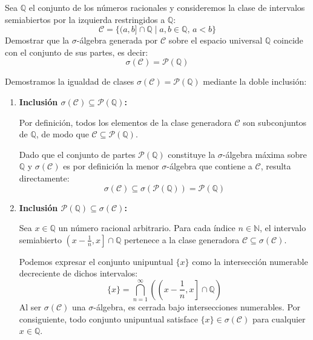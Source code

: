 \newpage
\begin{problema}
Sea $\mathbb{Q}$ el conjunto de los números racionales y consideremos la clase de intervalos semiabiertos por la izquierda restringidos a $\mathbb{Q}$:
\[
    \mathcal{C} = \bigl\{ (a, b] \cap \mathbb{Q} \mid a, b \in \mathbb{Q}, \, a < b \bigr\}
\]
Demostrar que la $\sigma$-álgebra generada por $\mathcal{C}$ sobre el espacio universal $\mathbb{Q}$ coincide con el conjunto de sus partes, es decir:
\[
    \sigma(\mathcal{C}) = \mathcal{P}(\mathbb{Q})
\]

\tcblower

Demostramos la igualdad de clases $\sigma(\mathcal{C}) = \mathcal{P}(\mathbb{Q})$ mediante la doble inclusión:

\begin{enumerate}
    \item \textbf{Inclusión $\sigma(\mathcal{C}) \subseteq \mathcal{P}(\mathbb{Q})$:}
    
    Por definición, todos los elementos de la clase generadora $\mathcal{C}$ son subconjuntos de $\mathbb{Q}$, de modo que $\mathcal{C} \subseteq \mathcal{P}(\mathbb{Q})$. 
    
    Dado que el conjunto de partes $\mathcal{P}(\mathbb{Q})$ constituye la $\sigma$-álgebra máxima sobre $\mathbb{Q}$ y $\sigma(\mathcal{C})$ es por definición la menor $\sigma$-álgebra que contiene a $\mathcal{C}$, resulta directamente:
    \[
        \sigma(\mathcal{C}) \subseteq \sigma(\mathcal{P}(\mathbb{Q})) = \mathcal{P}(\mathbb{Q})
    \]

    \item \textbf{Inclusión $\mathcal{P}(\mathbb{Q}) \subseteq \sigma(\mathcal{C})$:}
    
    Sea $x \in \mathbb{Q}$ un número racional arbitrario. Para cada índice $n \in \mathbb{N}$, el intervalo semiabierto $\left(x - \frac{1}{n}, x\right] \cap \mathbb{Q}$ pertenece a la clase generadora $\mathcal{C} \subseteq \sigma(\mathcal{C})$.
    
    Podemos expresar el conjunto unipuntual $\{x\}$ como la intersección numerable decreciente de dichos intervalos:
    \[
        \{x\} = \bigcap_{n=1}^\infty \left( \left(x - \frac{1}{n}, x\right] \cap \mathbb{Q} \right)
    \]
    Al ser $\sigma(\mathcal{C})$ una $\sigma$-álgebra, es cerrada bajo intersecciones numerables. Por consiguiente, todo conjunto unipuntual satisface $\{x\} \in \sigma(\mathcal{C})$ para cualquier $x \in \mathbb{Q}$.


\end{enumerate}
\end{problema}
